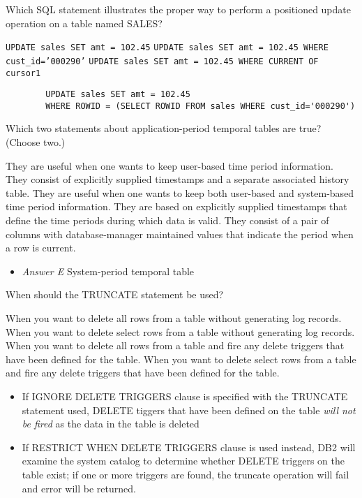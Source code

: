 \documentclass[answers, 11pt]{exam}
\begin{document}
\begin{questions}
\newpage
\question[1]
Which SQL statement illustrates the proper way to perform a positioned update operation on a table named
SALES?
\begin{choices}
\choice \texttt{UPDATE sales SET amt = 102.45}
\choice \texttt{UPDATE sales SET amt = 102.45 WHERE cust\_id='000290'}
\CorrectChoice \texttt{UPDATE sales SET amt = 102.45 WHERE CURRENT OF cursor1}
\choice \begin{verbatim}
		UPDATE sales SET amt = 102.45
		WHERE ROWID = (SELECT ROWID FROM sales WHERE cust_id='000290')
		\end{verbatim}
\end{choices}

\question[1]
Which two statements about application-period temporal tables are true? (Choose two.)
\begin{choices}
\CorrectChoice They are useful when one wants to keep user-based time period information.
\choice They consist of explicitly supplied timestamps and a separate associated history table.
\choice They are useful when one wants to keep both user-based and system-based time period information.
\CorrectChoice They are based on explicitly supplied timestamps that define the time periods during which
data is valid.
\choice They consist of a pair of columns with database-manager maintained values that indicate the 
period when a row is current.
\end{choices}

\begin{solution}
\begin{itemize}
\item \textit{Answer E} System-period temporal table
\end{itemize}
\end{solution}

\question[1]
When should the TRUNCATE statement be used?
\begin{choices}
\CorrectChoice When you want to delete all rows from a table without generating log records.
\choice When you want to delete select rows from a table without generating log records.
\choice When you want to delete all rows from a table and fire any delete triggers that have been 
defined for the table.
\choice When you want to delete select rows from a table and fire any delete triggers that have been
defined for the table.
\end{choices}

\begin{solution}
\begin{itemize}
\item If IGNORE DELETE TRIGGERS clause is specified with the TRUNCATE statement used, DELETE tiggers that 
have been defined on the table \textit{will not be fired} as the data in the table is deleted
\item If RESTRICT WHEN DELETE TRIGGERS clause is used instead, DB2 will examine the system catalog to 
determine whether DELETE triggers on the table exist; if one or more triggers are found, the truncate
operation will fail and error will be returned.
\end{itemize}


\end{solution}
\end{questions}
\end{document}
